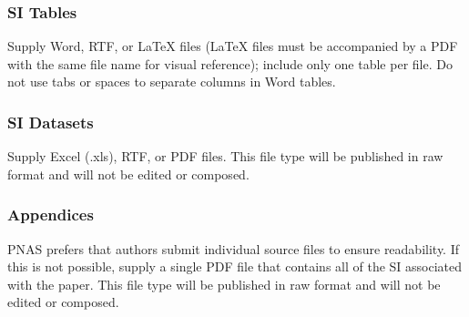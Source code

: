 \documentclass[9pt,twocolumn,twoside]{pnas-new}
\begin{document}
\subsubsection*{SI Tables}

Supply Word, RTF, or LaTeX files (LaTeX files must be accompanied by a PDF with the same file name for visual reference); include only one table per file. Do not use tabs or spaces to separate columns in Word tables.

\subsubsection*{SI Datasets} 

Supply Excel (.xls), RTF, or PDF files. This file type will be published in raw format and will not be edited or composed. 

\subsubsection*{Appendices}

PNAS prefers that authors submit individual source files to ensure readability. If this is not possible, supply a single PDF file that contains all of the SI associated with the paper. This file type will be published in raw format and will not be edited or composed.


\showmatmethods{} %


\showacknow{} %



\end{document}
